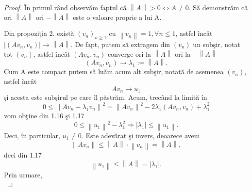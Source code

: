 \documentclass[a4paper,12pt,oneside]{report}
\begin{document}
\begin{proof}
\^{I}n primul r\^{a}nd observ\u{a}m faptul c\u{a} \(\left \| A \right \| > 0 \Leftrightarrow A \neq 0\). S\u{a} demonstr\u{a}m c\u{a} ori \(\left \| A \right \|\) ori \(-\left \| A \right \|\) este o valoare proprie a lui A.

Din propozi\c{t}ia 2. exist\u{a} \(\left ( v_{n} \right )_{n\geq 1}\) cu \(\left \| v_{n} \right \| = 1, \forall n\leq 1\), astfel \^{i}nc\^{a}t \(\left | \left ( Av_{n}, v_{n} \right ) \right | \rightarrow \left \| A \right \|\). De fapt, putem s\u{a} extragem din \( \left (  v_{n} \right )\) un sub\c{s}ir, notat tot \(\left (  v_{n} \right )\), astfel \^{i}nc\^{a}t \(\left ( Av_{n} , v_{n}\right )\) converge ori la \(\left \| A \right \|\) ori la \( - \left \| A \right \|\)
\begin{displaymath}
  \left ( Av_{n}, v_{n} \right ) \rightarrow  \lambda _{1} := \left \| A \right \|. \label{eq:1.16} \tag{1.16 }
\end{displaymath}
Cum A este compact putem s\u{a} lu\u{a}m acum alt sub\c{s}ir, notat\u{a} de asemenea \(\left ( v_{n} \right )\), astfel \^{i}nc\^{a}t
\begin{displaymath}
  Av_{n} \rightarrow u_{1} \label{eq:1.17} \tag{1.17}
\end{displaymath}
\c{s}i acesta este sub\c{s}irul pe care \^{i}l p\u{a}str\u{a}m. Acum, trec\^{a}nd la limit\u{a} \^{i}n
\begin{displaymath}
  0\leq \left \| Av_{n}  - \lambda _{1}v_{n}\right \|^{2} = \left \| Av_{n} \right \|^{2} - 2\lambda _{1}\left ( Av_{n}, v_{n} \right ) + \lambda _{1}^{2} \label{eq:1.18} \tag{1.18}
\end{displaymath}
vom ob\c{t}ine din  1.16 \c{s}i 1.17
\begin{displaymath}
  0 \leq  \left \| u_{1} \right \|^{2} - \lambda _{1}^{2} \Rightarrow \left | \lambda _{1} \right |\leq \left \| u_{1} \right \|.
\end{displaymath}
Deci, \^{i}n particular, \(u_{1}\neq 0\). Este adev\u{a}rat \c{s}i invers, deoarece avem
\begin{displaymath}
  \left \| Av_{n} \right \| \leq \left \| A \right \|\cdot \left \| v_{n} \right \| = \left \| A \right \|,
\end{displaymath}
deci din 1.17
\begin{displaymath}
  \left \| u_{1} \right \|\leq \left \| A \right \| = \left | \lambda _{1} \right |.
\end{displaymath}
Prin urmare,
\begin{displaymath}

\end{displaymath}
\end{proof}
\end{document}
